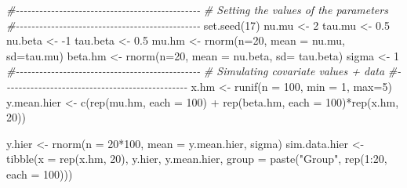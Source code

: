 \documentclass[
]{article}
\newenvironment{Shaded}{\begin{snugshade}}{\end{snugshade}}
\newcommand{\AttributeTok}[1]{\textcolor[rgb]{0.77,0.63,0.00}{#1}}
\newcommand{\CommentTok}[1]{\textcolor[rgb]{0.56,0.35,0.01}{\textit{#1}}}
\newcommand{\DecValTok}[1]{\textcolor[rgb]{0.00,0.00,0.81}{#1}}
\newcommand{\FloatTok}[1]{\textcolor[rgb]{0.00,0.00,0.81}{#1}}
\newcommand{\FunctionTok}[1]{\textcolor[rgb]{0.00,0.00,0.00}{#1}}
\newcommand{\NormalTok}[1]{#1}
\newcommand{\OtherTok}[1]{\textcolor[rgb]{0.56,0.35,0.01}{#1}}
\newcommand{\SpecialCharTok}[1]{\textcolor[rgb]{0.00,0.00,0.00}{#1}}
\newcommand{\StringTok}[1]{\textcolor[rgb]{0.31,0.60,0.02}{#1}}
\begin{document}
\begin{Shaded}
\begin{Highlighting}[]
\CommentTok{\#{-}{-}{-}{-}{-}{-}{-}{-}{-}{-}{-}{-}{-}{-}{-}{-}{-}{-}{-}{-}{-}{-}{-}{-}{-}{-}{-}{-}{-}{-}{-}{-}{-}{-}{-}{-}{-}{-}{-}{-}{-}{-}{-}{-}{-}{-}{-}}
\CommentTok{\# Setting the values of the parameters}
\CommentTok{\#{-}{-}{-}{-}{-}{-}{-}{-}{-}{-}{-}{-}{-}{-}{-}{-}{-}{-}{-}{-}{-}{-}{-}{-}{-}{-}{-}{-}{-}{-}{-}{-}{-}{-}{-}{-}{-}{-}{-}{-}{-}{-}{-}{-}{-}{-}{-}}
\FunctionTok{set.seed}\NormalTok{(}\DecValTok{17}\NormalTok{)}
\NormalTok{nu.mu }\OtherTok{\textless{}{-}} \DecValTok{2}
\NormalTok{tau.mu }\OtherTok{\textless{}{-}} \FloatTok{0.5}
\NormalTok{nu.beta }\OtherTok{\textless{}{-}} \SpecialCharTok{{-}}\DecValTok{1}
\NormalTok{tau.beta }\OtherTok{\textless{}{-}} \FloatTok{0.5}
\NormalTok{mu.hm }\OtherTok{\textless{}{-}} \FunctionTok{rnorm}\NormalTok{(}\AttributeTok{n=}\DecValTok{20}\NormalTok{, }\AttributeTok{mean =}\NormalTok{ nu.mu, }\AttributeTok{sd=}\NormalTok{tau.mu)}
\NormalTok{beta.hm }\OtherTok{\textless{}{-}} \FunctionTok{rnorm}\NormalTok{(}\AttributeTok{n=}\DecValTok{20}\NormalTok{, }\AttributeTok{mean =}\NormalTok{ nu.beta, }\AttributeTok{sd=}\NormalTok{ tau.beta)}
\NormalTok{sigma }\OtherTok{\textless{}{-}} \DecValTok{1}
\CommentTok{\#{-}{-}{-}{-}{-}{-}{-}{-}{-}{-}{-}{-}{-}{-}{-}{-}{-}{-}{-}{-}{-}{-}{-}{-}{-}{-}{-}{-}{-}{-}{-}{-}{-}{-}{-}{-}{-}{-}{-}{-}{-}{-}{-}{-}{-}{-}{-}}
\CommentTok{\# Simulating covariate values + data}
\CommentTok{\#{-}{-}{-}{-}{-}{-}{-}{-}{-}{-}{-}{-}{-}{-}{-}{-}{-}{-}{-}{-}{-}{-}{-}{-}{-}{-}{-}{-}{-}{-}{-}{-}{-}{-}{-}{-}{-}{-}{-}{-}{-}{-}{-}{-}{-}{-}{-}}
\NormalTok{x.hm }\OtherTok{\textless{}{-}} \FunctionTok{runif}\NormalTok{(}\AttributeTok{n =} \DecValTok{100}\NormalTok{, }\AttributeTok{min =} \DecValTok{1}\NormalTok{, }\AttributeTok{max=}\DecValTok{5}\NormalTok{)}
\NormalTok{y.mean.hier }\OtherTok{\textless{}{-}} \FunctionTok{c}\NormalTok{(}\FunctionTok{rep}\NormalTok{(mu.hm, }\AttributeTok{each =} \DecValTok{100}\NormalTok{) }\SpecialCharTok{+} 
                   \FunctionTok{rep}\NormalTok{(beta.hm, }\AttributeTok{each =} \DecValTok{100}\NormalTok{)}\SpecialCharTok{*}\FunctionTok{rep}\NormalTok{(x.hm, }\DecValTok{20}\NormalTok{))}

\NormalTok{y.hier }\OtherTok{\textless{}{-}} \FunctionTok{rnorm}\NormalTok{(}\AttributeTok{n =} \DecValTok{20}\SpecialCharTok{*}\DecValTok{100}\NormalTok{, }\AttributeTok{mean =}\NormalTok{ y.mean.hier, sigma)}
\NormalTok{sim.data.hier }\OtherTok{\textless{}{-}} \FunctionTok{tibble}\NormalTok{(}\AttributeTok{x =} \FunctionTok{rep}\NormalTok{(x.hm, }\DecValTok{20}\NormalTok{), }
\NormalTok{                        y.hier, y.mean.hier, }
                        \AttributeTok{group =} \FunctionTok{paste}\NormalTok{(}\StringTok{"Group"}\NormalTok{, }\FunctionTok{rep}\NormalTok{(}\DecValTok{1}\SpecialCharTok{:}\DecValTok{20}\NormalTok{, }\AttributeTok{each =} \DecValTok{100}\NormalTok{)))}
\end{Highlighting}
\end{Shaded}
\end{document}
